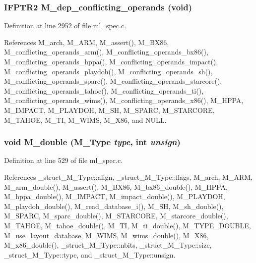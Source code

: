 \subsubsection{\setlength{\rightskip}{0pt plus 5cm}\bf{IFPTR2} M\_\-dep\_\-conflicting\_\-operands (void)}\label{ml__spec_8c_19c8877ed3c64496ba4d90a47b22bcbf}




Definition at line 2952 of file ml\_\-spec.c.

References M\_\-arch, M\_\-ARM, M\_\-assert(), M\_\-BX86, M\_\-conflicting\_\-operands\_\-arm(), M\_\-conflicting\_\-operands\_\-bx86(), M\_\-conflicting\_\-operands\_\-hppa(), M\_\-conflicting\_\-operands\_\-impact(), M\_\-conflicting\_\-operands\_\-playdoh(), M\_\-conflicting\_\-operands\_\-sh(), M\_\-conflicting\_\-operands\_\-sparc(), M\_\-conflicting\_\-operands\_\-starcore(), M\_\-conflicting\_\-operands\_\-tahoe(), M\_\-conflicting\_\-operands\_\-ti(), M\_\-conflicting\_\-operands\_\-wims(), M\_\-conflicting\_\-operands\_\-x86(), M\_\-HPPA, M\_\-IMPACT, M\_\-PLAYDOH, M\_\-SH, M\_\-SPARC, M\_\-STARCORE, M\_\-TAHOE, M\_\-TI, M\_\-WIMS, M\_\-X86, and NULL.
\subsubsection{\setlength{\rightskip}{0pt plus 5cm}void M\_\-double (\bf{M\_\-Type} {\em type}, int {\em unsign})}\label{ml__spec_8c_129481aafa26c5b5e773484bfa68b754}




Definition at line 529 of file ml\_\-spec.c.

References \_\-struct\_\-M\_\-Type::align, \_\-struct\_\-M\_\-Type::flags, M\_\-arch, M\_\-ARM, M\_\-arm\_\-double(), M\_\-assert(), M\_\-BX86, M\_\-bx86\_\-double(), M\_\-HPPA, M\_\-hppa\_\-double(), M\_\-IMPACT, M\_\-impact\_\-double(), M\_\-PLAYDOH, M\_\-playdoh\_\-double(), M\_\-read\_\-database\_\-i(), M\_\-SH, M\_\-sh\_\-double(), M\_\-SPARC, M\_\-sparc\_\-double(), M\_\-STARCORE, M\_\-starcore\_\-double(), M\_\-TAHOE, M\_\-tahoe\_\-double(), M\_\-TI, M\_\-ti\_\-double(), M\_\-TYPE\_\-DOUBLE, M\_\-use\_\-layout\_\-database, M\_\-WIMS, M\_\-wims\_\-double(), M\_\-X86, M\_\-x86\_\-double(), \_\-struct\_\-M\_\-Type::nbits, \_\-struct\_\-M\_\-Type::size, \_\-struct\_\-M\_\-Type::type, and \_\-struct\_\-M\_\-Type::unsign.

